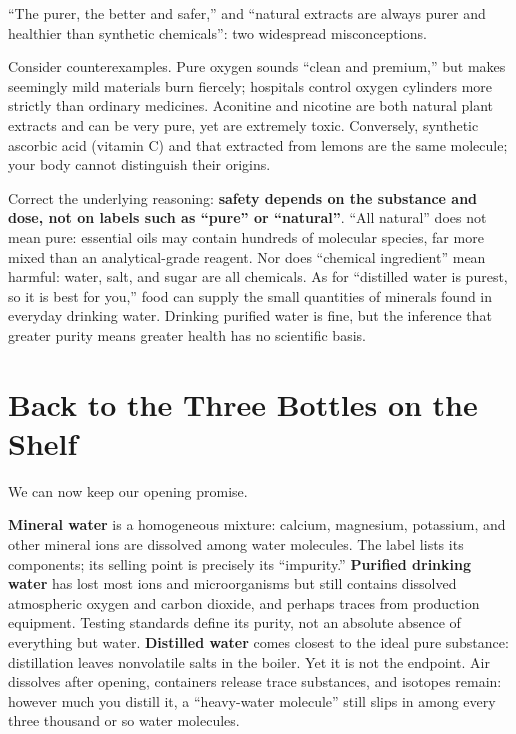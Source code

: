 \begin{wuqu}
``The purer, the better and safer,'' and ``natural extracts are always purer and healthier than synthetic chemicals'': two widespread misconceptions.

Consider counterexamples. Pure oxygen sounds ``clean and premium,'' but makes seemingly mild materials burn fiercely; hospitals control oxygen cylinders more strictly than ordinary medicines. Aconitine and nicotine are both natural plant extracts and can be very pure, yet are extremely toxic. Conversely, synthetic ascorbic acid (vitamin C) and that extracted from lemons are the same molecule; your body cannot distinguish their origins.

Correct the underlying reasoning: \textbf{safety depends on the substance and dose, not on labels such as ``pure'' or ``natural''}. ``All natural'' does not mean pure: essential oils may contain hundreds of molecular species, far more mixed than an analytical-grade reagent. Nor does ``chemical ingredient'' mean harmful: water, salt, and sugar are all chemicals. As for ``distilled water is purest, so it is best for you,'' food can supply the small quantities of minerals found in everyday drinking water. Drinking purified water is fine, but the inference that greater purity means greater health has no scientific basis.
\end{wuqu}

\section{Back to the Three Bottles on the Shelf}

We can now keep our opening promise.

\textbf{Mineral water} is a homogeneous mixture: calcium, magnesium, potassium, and other mineral ions are dissolved among water molecules. The label lists its components; its selling point is precisely its ``impurity.'' \textbf{Purified drinking water} has lost most ions and microorganisms but still contains dissolved atmospheric oxygen and carbon dioxide, and perhaps traces from production equipment. Testing standards define its purity, not an absolute absence of everything but water. \textbf{Distilled water} comes closest to the ideal pure substance: distillation leaves nonvolatile salts in the boiler. Yet it is not the endpoint. Air dissolves after opening, containers release trace substances, and isotopes remain: however much you distill it, a ``heavy-water molecule'' still slips in among every three thousand or so water molecules.

